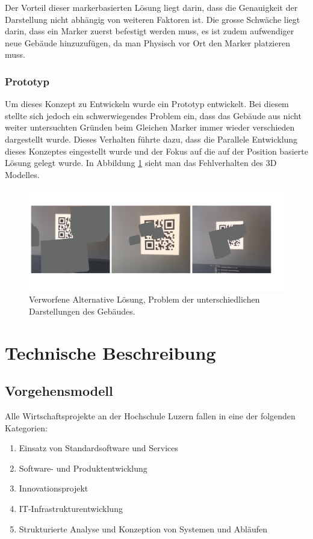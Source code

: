 \documentclass[a4paper]{scrreprt}
\begin{document}
Der Vorteil dieser markerbasierten Lösung liegt darin, dass die Genauigkeit der Darstellung nicht abhängig von weiteren Faktoren ist. Die grosse Schwäche liegt darin, dass ein Marker zuerst befestigt werden muss, es ist zudem aufwendiger neue Gebäude hinzuzufügen, da man Physisch vor Ort den Marker platzieren muss.

\subsection{Prototyp}
Um dieses Konzept zu Entwickeln wurde ein Prototyp entwickelt. Bei diesem stellte sich jedoch ein schwerwiegendes Problem ein, dass das Gebäude aus nicht weiter untersuchten Gründen beim Gleichen Marker immer wieder verschieden dargestellt wurde. Dieses Verhalten führte dazu, dass die Parallele Entwicklung dieses Konzeptes eingestellt wurde und der Fokus auf die auf der Position basierte Lösung gelegt wurde. In Abbildung \ref{fig:alternativeSolution} sieht man das Fehlverhalten des 3D Modelles.

\begin{figure}[h!]
	\includegraphics[keepaspectratio, width=\textwidth]{alternativeLoesung.png}
	\caption{Verworfene Alternative Lösung, Problem der unterschiedlichen Darstellungen des Gebäudes.}
    \label{fig:alternativeSolution}
\end{figure}

\chapter{Technische Beschreibung}

\section{Vorgehensmodell}

Alle Wirtschaftsprojekte an der Hochschule Luzern fallen in eine der folgenden Kategorien:

\begin{enumerate}
	\item Einsatz von Standardsoftware und Services
	\item Software- und Produktentwicklung
	\item Innovationsprojekt
	\item IT-Infrastrukturentwicklung
	\item Strukturierte Analyse und Konzeption von Systemen und Abläufen
\end{enumerate}
\end{document}

